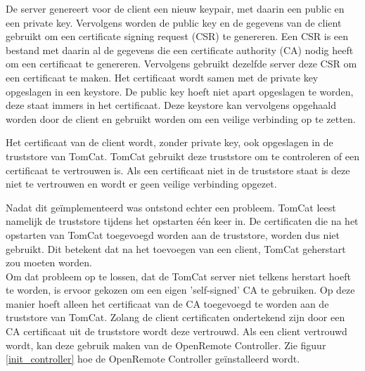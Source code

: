 \documentclass[]{article}
\begin{document}
De server genereert voor de client een nieuw keypair, met daarin een
public en een private key. Vervolgens worden de public key en de gegevens van de
client gebruikt om een certificate signing request (CSR) te genereren. Een
CSR is een bestand met daarin al de gegevens die een certificate authority (CA)
nodig heeft om een certificaat te genereren. Vervolgens gebruikt dezelfde server
deze CSR om een certificaat te maken. Het certificaat wordt samen met de private
key opgeslagen in een keystore. De public key hoeft niet apart opgeslagen te
worden, deze staat immers in het certificaat. Deze keystore kan vervolgens
opgehaald worden door de client en gebruikt worden om een veilige verbinding op
te zetten.

Het certificaat van de client wordt, zonder private key, ook opgeslagen in de
truststore van TomCat. TomCat gebruikt deze truststore om te controleren of een
certificaat te vertrouwen is. Als een certificaat niet in de truststore staat
is deze niet te vertrouwen en wordt er geen veilige verbinding opgezet. 

Nadat dit ge\"implementeerd was ontstond echter een probleem. TomCat leest
namelijk de truststore tijdens het opstarten \'e\'en keer in. De certificaten
die na het opstarten van TomCat toegevoegd worden aan de truststore, worden dus
niet gebruikt. Dit betekent dat na het toevoegen van een client, TomCat
geherstart zou moeten worden.  \\Om dat probleem op te lossen, dat de TomCat
server niet telkens herstart hoeft te worden, is ervoor gekozen om een eigen
'self-signed' CA te gebruiken. Op deze manier hoeft alleen het certificaat van
de CA toegevoegd te worden aan de truststore van TomCat.  Zolang de client
certificaten ondertekend zijn door een CA certificaat uit de truststore wordt
deze vertrouwd. Als een client vertrouwd wordt, kan deze gebruik maken van de
OpenRemote Controller. Zie figuur \ref{init_controller} hoe de OpenRemote
Controller ge\"installeerd wordt.

\newpage
\end{document}
